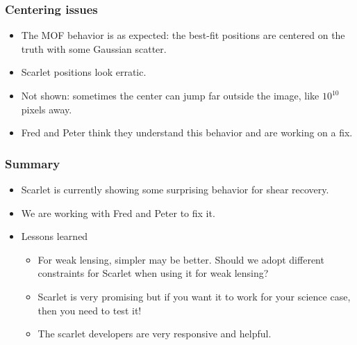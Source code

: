 \documentclass{beamer}
\begin{document}
\frame
{
    \frametitle{Centering issues}

    \begin{itemize}

        \item The MOF behavior is as expected: the best-fit positions are
            centered on the truth with some Gaussian scatter.

        \item Scarlet positions look erratic.

        \item Not shown: sometimes the center can jump far outside the image,
            like $10^{10}$ pixels away.

        \item Fred and Peter think they understand this behavior and are
            working on a fix.

    \end{itemize}

}


\frame
{
    \frametitle{Summary}

    \begin{itemize}

        \item Scarlet is currently showing some surprising behavior
            for shear recovery.

        \item We are working with Fred and Peter to fix it.

        \item Lessons learned
            \begin{itemize}

                \item For weak lensing, simpler may be better.  Should we
                    adopt different constraints for Scarlet when
                    using it for weak lensing?

                \item Scarlet is very promising but if you want it to work for
                    your science case, then you need to test it!

                \item The scarlet developers are very responsive and
                    helpful.

            \end{itemize}

    \end{itemize}

}
\end{document}
